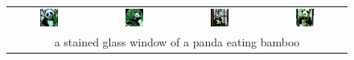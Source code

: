 \begin{figure}[ht!]
\begin{tabular}{cccc}
        \includegraphics[width=0.24\textwidth]{figures/cross/panda_0.jpg} &
        \includegraphics[width=0.24\textwidth]{figures/cross/panda_1.jpg} &
        \includegraphics[width=0.24\textwidth]{figures/cross/panda_2.jpg} &
        \includegraphics[width=0.24\textwidth]{figures/cross/panda_3.jpg} \vspace{-1mm}\\
        \multicolumn{4}{c}{\small a stained glass window of a panda eating bamboo}\\


\end{tabular}
\end{figure}
